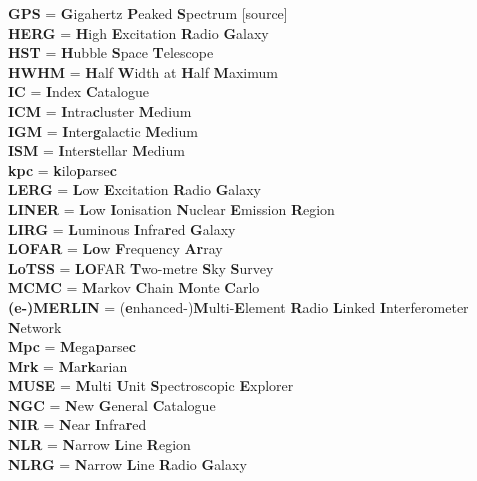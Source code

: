 {\textbf{GPS} = \textbf{G}igahertz \textbf{P}eaked \textbf{S}pectrum [source] \\
\textbf{HERG} = \textbf{H}igh \textbf{E}xcitation \textbf{R}adio \textbf{G}alaxy \\
\textbf{HST} = \textbf{H}ubble \textbf{S}pace \textbf{T}elescope \\
\textbf{HWHM} = \textbf{H}alf \textbf{W}idth at \textbf{H}alf \textbf{M}aximum \\
\textbf{IC} = \textbf{I}ndex \textbf{C}atalogue \\ 
\textbf{ICM} = \textbf{I}ntra\textbf{c}luster \textbf{M}edium \\
\textbf{IGM} = \textbf{I}nter\textbf{g}alactic \textbf{M}edium \\ 
\textbf{ISM} = \textbf{I}nter\textbf{s}tellar \textbf{M}edium \\ 
\textbf{kpc} = \textbf{k}ilo\textbf{p}arse\textbf{c} \\ 
\textbf{LERG} = \textbf{L}ow \textbf{E}xcitation \textbf{R}adio \textbf{G}alaxy \\
\textbf{LINER} = \textbf{L}ow \textbf{I}onisation \textbf{N}uclear \textbf{E}mission \textbf{R}egion \\
\textbf{LIRG} = \textbf{L}uminous \textbf{I}nfra\textbf{r}ed \textbf{G}alaxy \\
\textbf{LOFAR} = \textbf{Lo}w \textbf{F}requency \textbf{Ar}ray \\
\textbf{LoTSS} = \textbf{LO}FAR \textbf{T}wo-metre \textbf{S}ky \textbf{S}urvey \\
\textbf{MCMC} = \textbf{M}arkov \textbf{C}hain \textbf{M}onte \textbf{C}arlo \\
\textbf{(e-)MERLIN} = (\textbf{e}nhanced-)\textbf{M}ulti-\textbf{E}lement \textbf{R}adio \textbf{L}inked \textbf{I}nterferometer \textbf{N}etwork \\
\textbf{Mpc} = \textbf{M}ega\textbf{p}arse\textbf{c} \\ 
\textbf{Mrk} = \textbf{M}a\textbf{rk}arian \\ 
\textbf{MUSE} = \textbf{M}ulti \textbf{U}nit \textbf{S}pectroscopic \textbf{E}xplorer \\
\textbf{NGC} = \textbf{N}ew \textbf{G}eneral \textbf{C}atalogue \\
\textbf{NIR} = \textbf{N}ear \textbf{I}nfra\textbf{r}ed \\
\textbf{NLR} = \textbf{N}arrow \textbf{L}ine \textbf{R}egion \\
\textbf{NLRG} = \textbf{N}arrow \textbf{L}ine \textbf{R}adio \textbf{G}alaxy \\
}
